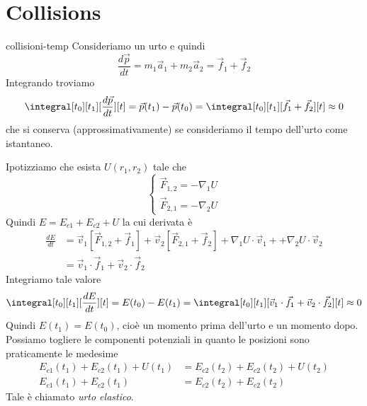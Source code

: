 \documentclass[preview]{standalone}
\begin{document}
\genpage

\section{Collisions}

%
%

\begin{snippet}{collisioni-temp}
    Consideriamo un urto e quindi
    \[
        \frac{d\vec{p}}{dt} = m_1\vec{a}_1 + m_2\vec{a}_2 = \vec{f}_1 + \vec{f}_2
    \]
    Integrando troviamo
    \[
        \integral[t_0][t_1][\frac{d\vec{p}}{dt}][t] = \vec{p}(t_1) - \vec{p}(t_0) =
        \integral[t_0][t_1][\vec{f}_1 + \vec{f}_2][t] \approx 0
    \]
    che si conserva (approssimativamente) se consideriamo il tempo dell'urto come istantaneo.

    Ipotizziamo che esista \(U(r_1, r_2)\) tale che
    \[
        \begin{cases}
            \vec{F}_{1,2} = -\nabla_1 U \\
            \vec{F}_{2,1} = -\nabla_2 U
        \end{cases}
    \]
    Quindi \(E = E_{c1} + E_{c2} + U\) la cui derivata è
    \begin{align*}
        \frac{dE}{dt} &= \vec{v}_1 \left[\vec{F}_{1,2} + \vec{f}_1\right]
        + \vec{v}_2 \left[\vec{F}_{2,1} + \vec{f}_2\right]
        + \nabla_1 U\cdot \vec{v}_1 + + \nabla_2 U\cdot \vec{v}_2 \\
        &= \vec{v}_1 \cdot \vec{f}_1 + \vec{v}_2 \cdot \vec{f}_2
    \end{align*}
    Integriamo tale valore
    \[
        \integral[t_0][t_1][\frac{dE}{dt}][t] = E(t_0) - E(t_1) =
        \integral[t_0][t_1][\vec{v}_1 \cdot \vec{f}_1 + \vec{v}_2 \cdot \vec{f}_2][t] \approx 0
    \]
    Quindi \(E(t_1) = E(t_0)\), cioè un momento prima dell'urto e un momento dopo.
    Possiamo togliere le componenti potenziali in quanto le posizioni sono praticamente le medesime
    \begin{align*}
        E_{c1}(t_1) + E_{c2}(t_1) + U(t_1) &= E_{c2}(t_2) + E_{c2}(t_2) + U(t_2) \\
        E_{c1}(t_1) + E_{c2}(t_1) &= E_{c2}(t_2) + E_{c2}(t_2)
    \end{align*}
    Tale è chiamato \emph{urto elastico}.

\end{snippet}
\end{document}
